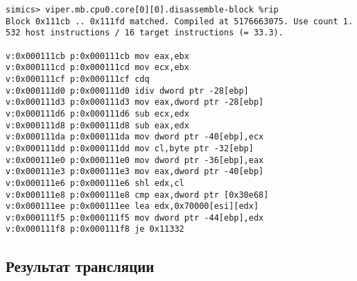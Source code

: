 \begin{lstlisting}
simics> viper.mb.cpu0.core[0][0].disassemble-block %rip
Block 0x111cb .. 0x111fd matched. Compiled at 5176663075. Use count 1.
532 host instructions / 16 target instructions (= 33.3).

v:0x000111cb p:0x000111cb mov eax,ebx
v:0x000111cd p:0x000111cd mov ecx,ebx
v:0x000111cf p:0x000111cf cdq
v:0x000111d0 p:0x000111d0 idiv dword ptr -28[ebp]
v:0x000111d3 p:0x000111d3 mov eax,dword ptr -28[ebp]
v:0x000111d6 p:0x000111d6 sub ecx,edx
v:0x000111d8 p:0x000111d8 sub eax,edx
v:0x000111da p:0x000111da mov dword ptr -40[ebp],ecx
v:0x000111dd p:0x000111dd mov cl,byte ptr -32[ebp]
v:0x000111e0 p:0x000111e0 mov dword ptr -36[ebp],eax
v:0x000111e3 p:0x000111e3 mov eax,dword ptr -40[ebp]
v:0x000111e6 p:0x000111e6 shl edx,cl
v:0x000111e8 p:0x000111e8 cmp eax,dword ptr [0x30e68]
v:0x000111ee p:0x000111ee lea edx,0x70000[esi][edx]
v:0x000111f5 p:0x000111f5 mov dword ptr -44[ebp],edx
v:0x000111f8 p:0x000111f8 je 0x11332
\end{lstlisting}

\subsection{Результат трансляции}

